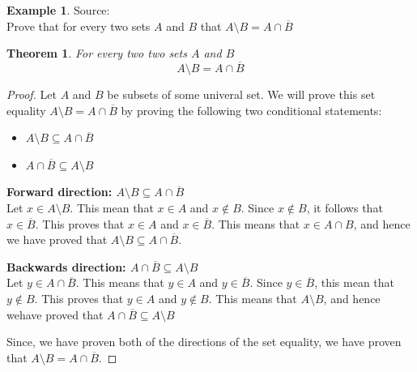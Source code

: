 \documentclass{book}
\newtheorem{theorem}{Theorem}[section]
\theoremstyle{definition}
\newtheorem{example}{Example}[definition]
\theoremstyle{remark}
\begin{document}
\begin{example}
Source: \cite[Chap.6, S.6.1, Result 6.6]{gray} \\ 

Prove that for every two sets $A$ and $B$ that $A \setminus B = A \cap \overline{B}$
    \begin{tcolorbox}
        \begin{theorem}
            For every two two sets $A$ and $B$
                \begin{equation*}
                    A \setminus B = A \cap \overline{B}
                \end{equation*}
        \end{theorem}
    \end{tcolorbox}


    \begin{proof}
        Let $A$ and $B$ be subsets of some univeral set. We will prove this set equality $A \setminus B = A \cap \overline{B}$ by proving the following two conditional statements:
            \begin{itemize}
                \item $A \setminus B \subseteq A \cap \overline{B}$
                \item $A \cap \overline{B} \subseteq A \setminus B$
            \end{itemize}
        
        \textbf{Forward direction: $A \setminus B \subseteq A \cap \overline{B}$ } \\ 
            Let $x \in A \setminus B$. This mean that $x \in A$ and $x \notin B$. Since $x \notin B$, it follows that $x \in \overline{B}$. This proves that $x \in A$ and $x \in \overline{B}$. This means that $x \in A \cap B$, and hence we have proved that $A \setminus B \subseteq A \cap \overline{B}$.
        
        \textbf{Backwards direction: $A \cap \overline{B} \subseteq A \setminus B$} \\
            Let $y \in A \cap \overline{B}$. This means that $y \in A$ and $y \in \overline{B}$. Since $y \in \overline{B}$, this mean that $y \notin B$. This proves that $y \in A$ and $y \notin B$. This means that $A \setminus B$, and hence wehave proved that $A \cap \overline{B} \subseteq A \setminus B$
        
        Since, we have proven both of the directions of the set equality, we have proven that $A \setminus B = A \cap \overline{B}$. 
    \end{proof}

\end{example}
\end{document}
